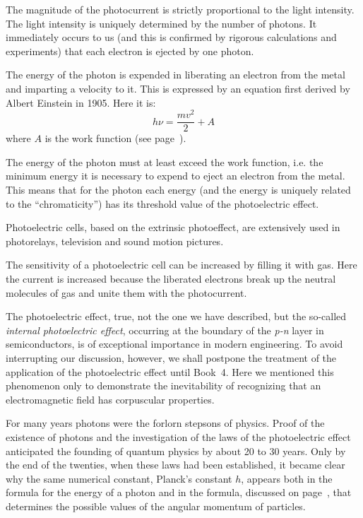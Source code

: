 The magnitude of the photocurrent is strictly proportional to the light intensity. The light intensity is uniquely determined by the number of photons. It immediately occurs to us (and this is confirmed by rigorous calculations and experiments) that each electron is ejected by one photon.

The energy of the photon is expended in liberating an electron from the metal and imparting a velocity to it. This is expressed by an equation first derived by Albert Einstein in 1905. Here it is:
\begin{equation*}%
h \nu = \frac{mv^{2}}{2} + A
\end{equation*}
where $A$ is the work function (see page~\pageref{work-func}).

The energy of the photon must at least exceed the work function, i.e. the minimum energy it is necessary to expend to eject an electron from the metal. This means that for the photon each energy (and the energy is uniquely related to the ``chromaticity'') has its threshold value of the photoelectric effect.

Photoelectric cells, based on the extrinsic photoeffect, are extensively used in photorelays, television and sound motion pictures.

The sensitivity of a photoelectric cell can be increased by filling it with gas. Here the current is increased because the liberated electrons break up the neutral molecules of gas and unite them with the photocurrent.

The photoelectric effect, true, not the one we have described, but the so-called \emph{internal photoelectric effect}, occurring at the boundary of the \emph{p-n} layer in semiconductors, is of exceptional importance in modern engineering. To avoid interrupting our discussion, however, we shall postpone the treatment of the application of the photoelectric effect until Book~4. Here we mentioned this phenomenon only to demonstrate the inevitability of recognizing that an electromagnetic field has corpuscular properties.

For many years photons were the forlorn stepsons of physics. Proof of the existence of photons and the investigation of the laws of the photoelectric effect anticipated the founding of quantum physics by about 20 to 30 years. Only by the end of the twenties, when these laws had been established, it became clear why the same numerical constant, Planck's constant $h$, appears both in the formula for the energy of a photon and in the formula, discussed on page~\pageref{ang-mom}, that determines the possible values of the angular momentum of particles.


